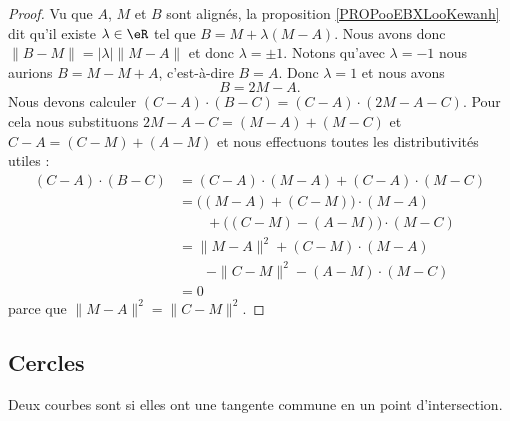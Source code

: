 \begin{proof}
	Vu que \( A\), \( M\) et \( B\) sont alignés, la proposition \ref{PROPooEBXLooKewanh} dit qu'il existe \( \lambda\in \eR\) tel que \( B=M+\lambda(M-A)\). Nous avons donc \( \| B-M \|=| \lambda |\| M-A \|\) et donc \( \lambda=\pm 1\). Notons qu'avec \( \lambda=-1\) nous aurions \( B=M-M+A\), c'est-à-dire \(B=A\). Donc \( \lambda=1\) et nous avons
	\begin{equation}
		B=2M-A.
	\end{equation}
	Nous devons calculer \( (C-A)\cdot (B-C)=(C-A)\cdot(2M-A-C)\). Pour cela nous substituons \( 2M-A-C=(M-A)+(M-C)\) et \( C-A=(C-M)+(A-M)\) et nous effectuons toutes les distributivités utiles :
	\begin{subequations}
		\begin{align}
			(C-A)\cdot (B-C) & =(C-A)\cdot(M-A)+(C-A)\cdot (M-C)                   \\
			                 & =\big( (M-A)+(C-M) \big)\cdot (M-A)                 \\
			                 & \qquad \nonumber+\big( (C-M)-(A-M) \big)\cdot (M-C) \\
			                 & =\| M-A \|^2+(C-M)\cdot(M-A)                        \\
			                 & \qquad\nonumber-\| C-M \|^2-(A-M)\cdot(M-C)         \\
			                 & =0
		\end{align}
	\end{subequations}
	parce que \( \| M-A \|^2=\| C-M \|^2\).
\end{proof}

\subsection{Cercles}


\begin{definition}	\label{DEFooLUYWooRPehYU}
	Deux courbes sont  si elles ont une tangente commune en un point d'intersection.
\end{definition}


